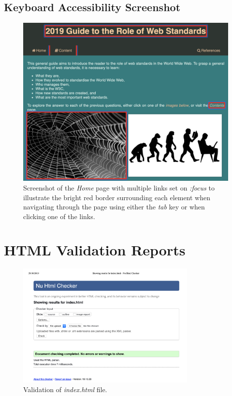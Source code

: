 \documentclass[letterpaper,12pt]{article}
\begin{document}
\begin{appendices}
\subsection{Keyboard Accessibility Screenshot}
\label{sec:appendix-accessibility-results-keyboard}

\begin{figure}[h] 
\centerline{\includegraphics[width=\textwidth]{report/images/border-focus.png}}
\caption{\label{fig:border-focus}Screenshot of the \textit{Home} page with multiple links set on \textit{:focus} to illustrate the bright red border surrounding each element when navigating through the page using either the \textit{tab} key or when clicking one of the links.}
\end{figure}

\clearpage
\section{HTML Validation Reports}
\label{sec:appendix-validation-reports}

\begin{figure}[h] 
\centerline{\includegraphics[width=0.8\textwidth]{report/images/validation-index.png}}
\caption{\label{fig:validation-index}Validation of \textit{index.html} file.}
\end{figure}


\end{appendices}
\end{document}
